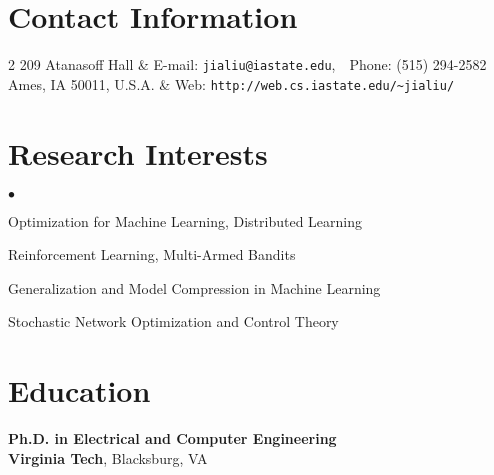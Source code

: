 \documentclass[overlapped,line,letterpaper]{res1}
\newenvironment{list2}{
  \begin{list}{$\bullet$}{%
      \setlength{\itemsep}{0in}
      \setlength{\parsep}{0in} \setlength{\parskip}{0in}
      \setlength{\topsep}{0in} \setlength{\partopsep}{0in}
      \setlength{\leftmargin}{0.2in}}}{\end{list}}
\begin{document}
\begin{resume}

\section{\bf \large Contact Information}
\vspace{.1in}
\begin{ncolumn}{2}
    209 Atanasoff Hall       & \hspace{-.5in} E-mail: {\tt jialiu@iastate.edu}, \,\, Phone: (515) 294-2582 \\
  Ames, IA 50011, U.S.A.                      & \hspace{-.5in} Web: {\tt \verb+http://web.cs.iastate.edu/~jialiu/+} \\
\end{ncolumn}


\section{\bf \large Research Interests}
\vspace{.24in}
\begin{list2}
\item Optimization for Machine Learning, Distributed Learning
\item Reinforcement Learning, Multi-Armed Bandits
\item Generalization and Model Compression in Machine Learning
\item Stochastic Network Optimization and Control Theory
\end{list2}




\section{\bf \large Education}
\vspace{.1in}
{\bf Ph.D. in Electrical and Computer Engineering} \\ %
{\bf Virginia Tech}, Blacksburg, VA
\vspace{-.02in}


\end{resume}
\end{document}

